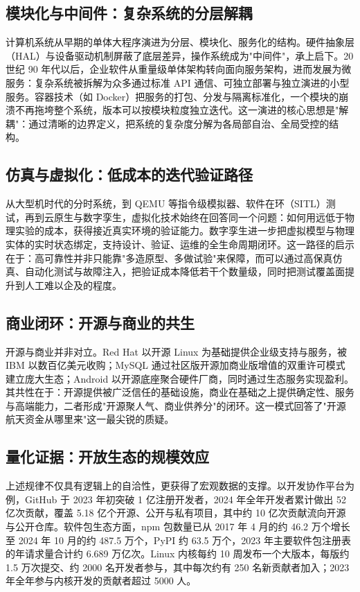 \documentclass[UTF8,a4paper,zihao=-4]{ctexart}
\begin{document}
\subsection{模块化与中间件：复杂系统的分层解耦}
计算机系统从早期的单体大程序演进为分层、模块化、服务化的结构。硬件抽象层（HAL）与设备驱动机制屏蔽了底层差异，操作系统成为"中间件"，承上启下。20 世纪 90 年代以后，企业软件从重量级单体架构转向面向服务架构，进而发展为微服务\cite{newman2015}：复杂系统被拆解为众多通过标准 API 通信、可独立部署与独立演进的小型服务。容器技术（如 Docker）把服务的打包、分发与隔离标准化\cite{docker2014}，一个模块的崩溃不再拖垮整个系统，版本可以按模块粒度独立迭代。这一演进的核心思想是"解耦"：通过清晰的边界定义，把系统的复杂度分解为各局部自治、全局受控的结构。

\subsection{仿真与虚拟化：低成本的迭代验证路径}
从大型机时代的分时系统，到 QEMU 等指令级模拟器、软件在环（SITL）测试，再到云原生与数字孪生\cite{glaessgen2012,grieves2017}，虚拟化技术始终在回答同一个问题：如何用远低于物理实验的成本，获得接近真实环境的验证能力。数字孪生进一步把虚拟模型与物理实体的实时状态绑定，支持设计、验证、运维的全生命周期闭环。这一路径的启示在于：高可靠性并非只能靠"多造原型、多做试验"来保障，而可以通过高保真仿真、自动化测试与故障注入，把验证成本降低若干个数量级，同时把测试覆盖面提升到人工难以企及的程度。

\subsection{商业闭环：开源与商业的共生}
开源与商业并非对立。Red Hat 以开源 Linux 为基础提供企业级支持与服务，被 IBM 以数百亿美元收购；MySQL 通过社区版开源加商业版增值的双重许可模式建立庞大生态；Android 以开源底座聚合硬件厂商，同时通过生态服务实现盈利。其共性在于：开源提供被广泛信任的基础设施，商业在基础之上提供确定性、服务与高端能力，二者形成"开源聚人气、商业供养分"的闭环。这一模式回答了"开源航天资金从哪里来"这一最尖锐的质疑。

\subsection{量化证据：开放生态的规模效应}
上述规律不仅具有逻辑上的自洽性，更获得了宏观数据的支撑。以开发协作平台为例，GitHub 于 2023 年初突破 1 亿注册开发者，2024 年全年开发者累计做出 52 亿次贡献，覆盖 5.18 亿个开源、公开与私有项目，其中约 10 亿次贡献流向开源与公开仓库\cite{octoverse2024}。软件包生态方面，npm 包数量已从 2017 年 4 月的约 46.2 万个增长至 2024 年 10 月的约 487.5 万个，PyPI 约 63.5 万个，2023 年主要软件包注册表的年请求量合计约 6.689 万亿次\cite{sonatype2024}。Linux 内核每约 10 周发布一个大版本，每版约 1.5 万次提交、约 2000 名开发者参与，其中每次约有 250 名新贡献者加入；2023 年全年参与内核开发的贡献者超过 5000 人\cite{lwn2023}。
\end{document}
